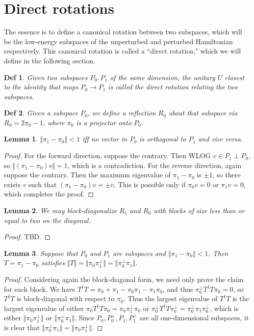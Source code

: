 \documentclass[11pt]{article}
\newtheorem{defn}{Def}
\newtheorem{lem}{Lemma}
\begin{document}
\section{Direct rotations}
The essence is to define a canonical rotation between two subspaces, which will be the low-energy subspaces of the unperturbed and perturbed Hamiltonian respectively. This canonical rotation is called a ``direct rotation," which we will define in the following section.
\begin{defn}
Given two subspaces $P_0, P_1$ of the same dimension, the unitary $U$ closest to the identity that maps $P_0 \to P_1$ is called the direct rotation relating the two subspaces. 
\end{defn}
\begin{defn}
Given a subspace $P_0$, we define a reflection $R_0$ about that subspace via $R_0 = 2\pi_0-1$, where $\pi_0$ is a projector onto $P_0$.
\end{defn}
\begin{lem}
$\Vert \pi_1 - \pi_0 \Vert < 1$ iff no vector in $P_0$ is orthogonal to $P_1$ and vice versa. 
\end{lem}
\begin{proof}
    For the forward direction, suppose the contrary. Then WLOG $v \in P_1 \perp P_0$, so $\Vert(\pi_1 - \pi_0)v\Vert = 1$, which is a contradiction. For the reverse direction, again suppose the contrary. Then the maximum eigenvalue of $\pi_1 - \pi_0$ is $\pm 1$, so there exists $v$ such that $(\pi_1 - \pi_0)v = \pm v$. This is possible only if $\pi_0v = 0$ or $\pi_1v = 0$, which completes the proof.
\end{proof}
\begin{lem}
We may block-diagonalize $R_1$ and $R_0$ with blocks of size less than or equal to two on the diagonal.
\end{lem}
\begin{proof}
TBD.
\end{proof}
\begin{lem}
Suppose that $P_0$ and $P_1$ are subspaces and $\Vert \pi_1 - \pi_0 \Vert < 1$. Then $T = \pi_1 - \pi_0$ satisfies $\Vert T \Vert = \Vert \pi_0 \pi_1^\perp \Vert = \Vert \pi_0^\perp \pi_1\Vert$.
\end{lem}
\begin{proof}
    Considering again the block-diagonal form, we need only prove the claim for each block. We have $T^\dagger T = \pi_0 + \pi_1 - \pi_0\pi_1 - \pi_1\pi_0$, and thus $\pi_0^\perp T^\dagger T \pi_0  = 0$, so $T^\dagger T$ is block-diagonal with respect to $\pi_0$. Thus the largest eigenvalue of $T^\dagger T$ is the largest eigenvalue of either $\pi_0 T^\dagger T \pi_0 = \pi_0 \pi_1^\perp \pi_0$ or $\pi_0^\perp T^\dagger T \pi_0^\perp = \pi_0^\perp \pi_1 \pi_0^\perp$, which is either $\Vert \pi_0 \pi_1^\perp\Vert$ or $\Vert \pi_0^\perp\pi_1 \Vert$. Since $P_0, P_0^\perp, P_1,P_1^\perp$ are all one-dimensional subspaces, it is clear that $\Vert \pi_0^\perp \pi_1 \Vert = \Vert \pi_0 \pi_1^\perp \Vert$.
\end{proof}
\end{document}

